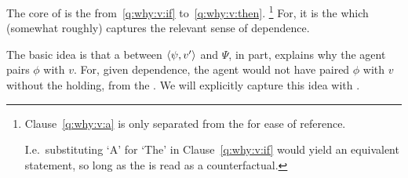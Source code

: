 \begin{note}
  The core of \qWhyV{} is the \qWVitc{} from~\ref{q:why:v:if} to~\ref{q:why:v:then}.%
  \footnote{
    Clause~\ref{q:why:v:a} is only separated from the \qWVitc{} for ease of reference.

    I.e.\ substituting `A' for `The' in Clause~\ref{q:why:v:if} would yield an equivalent statement, so long as the \qWVitc{} is read as a counterfactual.
  }
  For, it is the \qWVitc{} which (somewhat roughly) captures the relevant sense of dependence.
\end{note}

\begin{note}
    The basic idea is that a \ros{} between \(\langle \psi, v' \rangle\) and \(\Psi\), in part, explains why the agent pairs \(\phi\) with \(v\).
  For, given dependence, the agent would not have paired \(\phi\) with \(v\) without the \ros{} holding, from the \agpe{}.
  We will explicitly capture this idea with \linkW{}.
\end{note}

